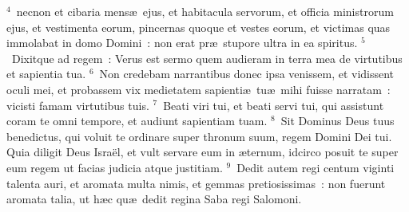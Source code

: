 ${}^{4}$~necnon et cibaria mens\ae\ ejus, et habitacula servorum, et officia ministrorum ejus, et vestimenta eorum, pincernas quoque et vestes eorum, et victimas quas immolabat in domo Domini~: non erat pr\ae\ stupore ultra in ea spiritus.
${}^{5}$~Dixitque ad regem~: Verus est sermo quem audieram in terra mea de virtutibus et sapientia tua.
${}^{6}$~Non credebam narrantibus donec ipsa venissem, et vidissent oculi mei, et probassem vix medietatem sapienti\ae\ tu\ae\ mihi fuisse narratam~: vicisti famam virtutibus tuis.
${}^{7}$~Beati viri tui, et beati servi tui, qui assistunt coram te omni tempore, et audiunt sapientiam tuam.
${}^{8}$~Sit Dominus Deus tuus benedictus, qui voluit te ordinare super thronum suum, regem Domini Dei tui. Quia diligit Deus Isra\"el, et vult servare eum in \ae ternum, idcirco posuit te super eum regem ut facias judicia atque justitiam.
${}^{9}$~Dedit autem regi centum viginti talenta auri, et aromata multa nimis, et gemmas pretiosissimas~: non fuerunt aromata talia, ut h\ae c qu\ae\ dedit regina Saba regi Salomoni.


